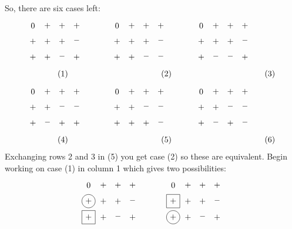 So, there are six cases left:
\begin{align*}
&\myarrset
\begin{array}{cccccccccccccc}
\ndcz & \ndcp & \ndcp & \ndcp & ~~~~~~~~~ & \ndcz & \ndcp & \ndcp & \ndcp & ~~~~~~~~~ & \ndcz & \ndcp & \ndcp & \ndcp \\
\ndcp & \ndcp & \ndcp & \ndcm & ~~~~~~~~~ & \ndcp & \ndcp & \ndcp & \ndcm & ~~~~~~~~~ & \ndcp & \ndcp & \ndcp & \ndcm \\
\ndcp & \ndcp & \ndcm & \ndcp & ~~~~~~~~~ & \ndcp & \ndcp & \ndcm & \ndcm & ~~~~~~~~~ & \ndcp & \ndcm & \ndcm & \ndcp
\end{array} \\
&\begin{array}{ccc}
\hspace{0.47in}(1) & \hspace{1.43in}(2) & \hspace{1.43in}(3)
\end{array} \\
\end{align*}
\begin{align*}
&\myarrset
\begin{array}{cccccccccccccc}
\ndcz & \ndcp & \ndcp & \ndcp & ~~~~~~~~~ & \ndcz & \ndcp & \ndcp & \ndcp & ~~~~~~~~~ & \ndcz & \ndcp & \ndcp & \ndcp \\
\ndcp & \ndcp & \ndcm & \ndcm & ~~~~~~~~~ & \ndcp & \ndcp & \ndcm & \ndcm & ~~~~~~~~~ & \ndcp & \ndcp & \ndcm & \ndcm \\
\ndcp & \ndcm & \ndcp & \ndcp & ~~~~~~~~~ & \ndcp & \ndcp & \ndcp & \ndcm & ~~~~~~~~~ & \ndcp & \ndcm & \ndcp & \ndcm
\end{array} \\
&\begin{array}{ccc}
\hspace{0.47in}(4) & \hspace{1.43in}(5) & \hspace{1.43in}(6)
\end{array}
\end{align*}
Exchanging rows 2 and 3 in (5) you get case (2) so these are equivalent.
Begin working on case (1) in column 1 which gives two possibilities:
\begin{equation*}
\myarrset
\begin{array}{ccccccccc}
\ndcz & \ndcp & \ndcp & \ndcp & ~~~~~~~~~ & \ndcz & \ndcp & \ndcp & \ndcp \\
\dcp  & \ndcp & \ndcp & \ndcm & ~~~~~~~~~ & \dsp  & \ndcp & \ndcp & \ndcm \\
\dsp  & \ndcp & \ndcm & \ndcp & ~~~~~~~~~ & \dcp  & \ndcp & \ndcm & \ndcp
\end{array}
\end{equation*}
